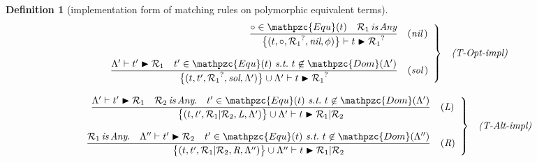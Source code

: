 \documentclass[12pt]{article}
\newtheorem{Definition}{Definition}[section]
\begin{document}
\begin{Definition}[implementation form of matching rules on
    polymorphic equivalent terms]
\begin{displaymath}
\begin{array}{c}
      \begin{array}{rl}
        \left. \begin{array}{rl}
          \dfrac{
            \circ \in \mathpzc{Equ}(t)
             \quad \mathcal{R}_1 \,\text{\it is}\, \text{\it Any}
          }{
            \bigl\{(t, \circ, {\mathcal{R}_1}^?, \text{\it nil}, \phi)
             \bigr\} \vdash t \blacktriangleright {\mathcal{R}_1}^?
          }  &  (\text{\it nil}\,)  \\
          \\
          
          \dfrac{
            \Lambda' \vdash t' \blacktriangleright \mathcal{R}_1 \quad
             t' \in \mathpzc{Equ}(t)\ \text{\it s.t.}\
              t \not\in \mathpzc{Dom}(\Lambda')
          }{
            \bigl\{(t, t', {\mathcal{R}_1}^?, \text{\it sol},
             \Lambda') \bigr\} \cup \Lambda' \vdash
              t \blacktriangleright {\mathcal{R}_1}^?
          }  &  (\text{\it sol}\,)
        \end{array} \right\}  &  \text{\it (T-Opt-impl)}
      \end{array}  \\
      \\
      
      \begin{array}{rl}
        \left. \begin{array}{rl}
          \dfrac{
            \Lambda' \vdash t' \blacktriangleright \mathcal{R}_1 \quad
             \mathcal{R}_2 \,\text{\it is}\, \text{\it Any}. \quad
              t' \in \mathpzc{Equ}(t)\ \text{\it s.t.}\
               t \not\in \mathpzc{Dom}(\Lambda')
          }{
            \bigl\{(t, t', \mathcal{R}_1|\mathcal{R}_2,
             \text{\it L}, \Lambda') \bigr\} \cup \Lambda' \vdash
              t \blacktriangleright \mathcal{R}_1|\mathcal{R}_2
          }  &  (\text{\it L})  \\
          \\
          
          \dfrac{
            \mathcal{R}_1 \,\text{\it is}\, \text{\it Any}. \quad
             \Lambda'' \vdash t' \blacktriangleright \mathcal{R}_2 \quad
              t' \in \mathpzc{Equ}(t)\ \text{\it s.t.}\
               t \not\in \mathpzc{Dom}(\Lambda'')
          }{
            \bigl\{(t, t', \mathcal{R}_1|\mathcal{R}_2,
             \text{\it R}, \Lambda'') \bigr\} \cup \Lambda'' \vdash
              t \blacktriangleright \mathcal{R}_1|\mathcal{R}_2
          }  &  (\text{\it R})
        \end{array} \right\}  &  \text{\it (T-Alt-impl)}
      \end{array}
      
    \end{array}
  \end{displaymath}
\end{Definition}
\end{document}
